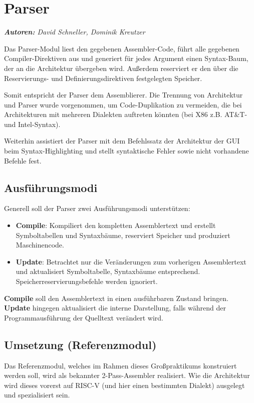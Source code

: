 \chapter{Parser}

\emph{\textbf{Autoren:} David Schneller, Dominik Kreutzer}

Das Parser-Modul liest den gegebenen Assembler-Code, führt alle gegebenen
Compiler-Direktiven aus und generiert für jedes Argument einen Syntax-Baum, der
an die Architektur übergeben wird.  Außerdem reserviert er den über die
Reservierungs- und Definierungsdirektiven festgelegten Speicher.

Somit entspricht der Parser dem Assemblierer.  Die Trennung von Architektur und
Parser wurde vorgenommen, um Code-Duplikation zu vermeiden, die bei
Architekturen mit mehreren Dialekten auftreten könnten (bei X86 z.B. AT\&T- und
Intel-Syntax).

Weiterhin assistiert der Parser mit dem Befehlssatz der Architektur der GUI beim
Syntax-Highlighting und stellt syntaktische Fehler sowie nicht vorhandene Befehle fest.

\section{Ausführungsmodi}

Generell soll der Parser zwei Ausführungsmodi unterstützen:
\begin{itemize}
\item \textbf{Compile}: Kompiliert den kompletten Assemblertext und erstellt Symboltabellen und Syntaxbäume, reserviert Speicher und produziert Maschinencode.
\item \textbf{Update}: Betrachtet nur die Veränderungen zum vorherigen Assemblertext und aktualisiert Symboltabelle, Syntaxbäume entsprechend. Speicherreservierungsbefehle werden ignoriert.
\end{itemize}

\textbf{Compile} soll den Assemblertext in einen ausführbaren Zustand bringen. \textbf{Update} hingegen aktualisiert die interne Darstellung, falls während der Programmausführung der Quelltext verändert wird.

\section{Umsetzung (Referenzmodul)}

Das Referenzmodul, welches im Rahmen dieses Großpraktikums konstruiert werden
soll, wird als bekannter 2-Pass-Assembler realisiert. Wie die Architektur wird
dieses vorerst auf RISC-V (und hier einen bestimmten Dialekt) ausgelegt und
spezialisiert sein.

